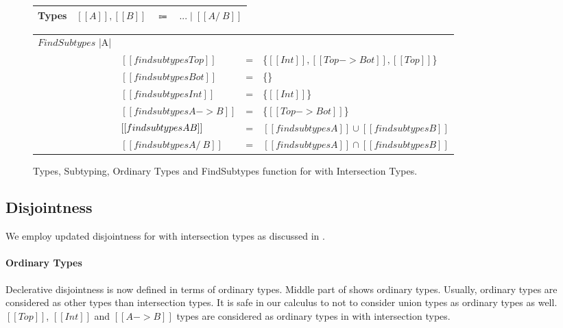 \begin{figure}[t]
  \begin{small}
    \centering
    \begin{tabular}{lrcl} \toprule
      Types & $[[A]], [[B]]$ & $\Coloneqq$ & $ ... \mid [[A /\ B]] $ \\
      \bottomrule
    \end{tabular}
  \end{small}
  \medskip
    \begin{small}
    \centering
  \end{small}
  \medskip
    \begin{small}
    \centering
  \end{small}
  \medskip
    \centering
    \begin{tabular}{llcl}
      \toprule
      $FindSubtypes$ |A| &  & & \\
     & $[[findsubtypes Top]]$ & = & \{$ [[Int]], [[Top -> Bot]], [[Top]] $\}  \\
     & $[[findsubtypes Bot]]$ & = & \{\}  \\
     & $[[findsubtypes Int]]$ & = & \{$ [[Int]] $\}  \\
     & $[[findsubtypes A -> B]]$ & = & \{$ [[Top -> Bot]] $\}  \\
     & $[[findsubtypes A \/ B]]$ & = & $ [[findsubtypes A]] \cup [[findsubtypes B]] $\\
     & $[[findsubtypes A /\ B]]$ & = & $ [[findsubtypes A]] \cap [[findsubtypes B]] $\\
      \bottomrule
    \end{tabular}
  \caption{Types, Subtyping, Ordinary Types and FindSubtypes function for \cal with Intersection Types.}
  \label{fig:inter:system}
\end{figure}

\subsection{Disjointness}
\label{sec:inter:disj}
We employ updated disjointness for \cal with intersection types as discussed in .

\paragraph{Ordinary Types}
Declerative disjointness is now defined in terms of ordinary types. Middle part of 
 shows ordinary types. Usually, ordinary types are considered as other types than
intersection types. It is safe in our calculus to not to consider union types as ordinary types as well.
$[[Top]]$, $[[Int]]$ and $[[A -> B]]$ types are considered as ordinary types in \cal with intersection
types.

